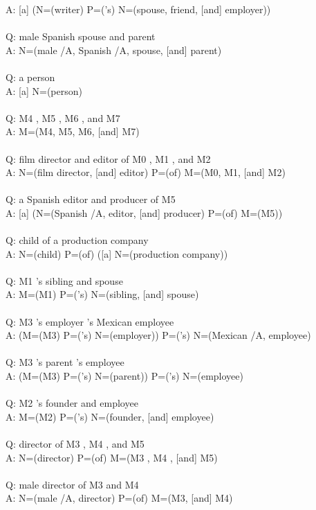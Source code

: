 \documentclass{article} \usepackage{iclr2022_conference,times}
\begin{document}
{A: [a] (N=(writer) P=('s) N=(spouse, friend, [and] employer)) \\
 \\
Q: male Spanish spouse and parent \\
A: N=(male /A, Spanish /A, spouse, [and] parent) \\
 \\
Q: a person \\
A: [a] N=(person) \\
 \\
Q: M4 , M5 , M6 , and M7 \\
A: M=(M4, M5, M6, [and] M7) \\
 \\
Q: film director and editor of M0 , M1 , and M2 \\
A: N=(film director, [and] editor) P=(of) M=(M0, M1, [and] M2) \\
 \\
Q: a Spanish editor and producer of M5 \\
A: [a] (N=(Spanish /A, editor, [and] producer) P=(of) M=(M5)) \\
 \\
Q: child of a production company \\
A: N=(child) P=(of) ([a] N=(production company)) \\
 \\
Q: M1 's sibling and spouse \\
A: M=(M1) P=('s) N=(sibling, [and] spouse) \\
 \\
Q: M3 's employer 's Mexican employee \\
A: (M=(M3) P=('s) N=(employer)) P=('s) N=(Mexican /A, employee) \\
 \\
Q: M3 's parent 's employee \\
A: (M=(M3) P=('s) N=(parent)) P=('s) N=(employee) \\
 \\
Q: M2 's founder and employee \\
A: M=(M2) P=('s) N=(founder, [and] employee) \\
 \\
Q: director of M3 , M4 , and M5 \\
A: N=(director) P=(of) M=(M3 , M4 , [and] M5) \\
 \\
Q: male director of M3 and M4 \\
A: N=(male /A, director) P=(of) M=(M3, [and] M4) \\
}
\end{document}
